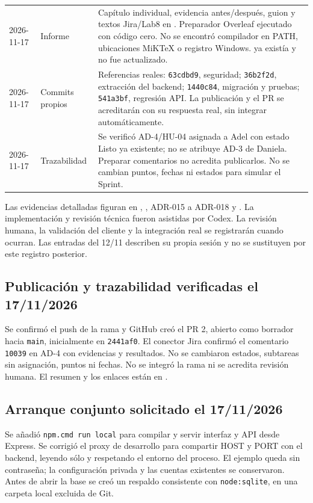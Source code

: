 \begin{longtable}{P{2.2cm}P{2.6cm}P{7.5cm}}
2026-11-17 & Informe & Capítulo individual, evidencia antes/después, guion y textos Jira/Lab8 en . Preparador Overleaf ejecutado con código cero. No se encontró compilador en PATH, ubicaciones MiKTeX o registro Windows.  ya existía y no fue actualizado. \\
2026-11-17 & Commits propios & Referencias reales: \texttt{63cdbd9}, seguridad; \texttt{36b2f2d}, extracción del backend; \texttt{1440c84}, migración y pruebas; \texttt{541a3bf}, regresión API. La publicación y el PR se acreditarán con su respuesta real, sin integrar automáticamente. \\
2026-11-17 & Trazabilidad & Se verificó AD-4/HU-04 asignada a Adel con estado Listo ya existente; no se atribuye AD-3 de Daniela. Preparar comentarios no acredita publicarlos. No se cambian puntos, fechas ni estados para simular el Sprint. \\
\bottomrule
\end{longtable}

Las evidencias detalladas figuran en , , ADR-015 a ADR-018 y . La implementación y revisión técnica fueron asistidas por Codex. La revisión humana, la validación del cliente y la integración real se registrarán cuando ocurran. Las entradas del 12/11 describen su propia sesión y no se sustituyen por este registro posterior.

\subsection{Publicación y trazabilidad verificadas el 17/11/2026}
Se confirmó el push de la rama y GitHub creó el PR 2, abierto como borrador hacia \texttt{main}, inicialmente en \texttt{2441af0}. El conector Jira confirmó el comentario \texttt{10039} en AD-4 con evidencias y resultados. No se cambiaron estados, subtareas sin asignación, puntos ni fechas. No se integró la rama ni se acredita revisión humana. El resumen y los enlaces están en .

\subsection{Arranque conjunto solicitado el 17/11/2026}
Se añadió \texttt{npm.cmd run local} para compilar y servir interfaz y API desde Express. Se corrigió el proxy de desarrollo para compartir HOST y PORT con el backend, leyendo sólo  y respetando el entorno del proceso. El ejemplo queda sin contraseña; la configuración privada y las cuentas existentes se conservaron. Antes de abrir la base se creó un respaldo consistente con \texttt{node:sqlite}, en una carpeta local excluida de Git.

